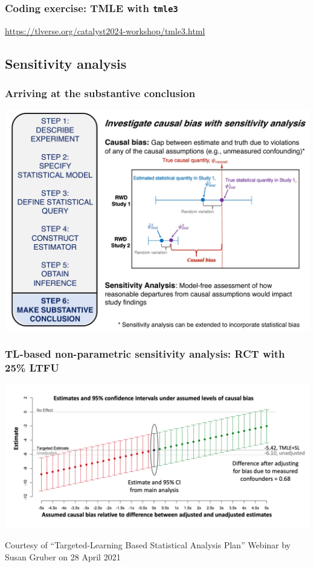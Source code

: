 \documentclass[t]{beamer}
\begin{document}
\begin{frame}
  \frametitle{Coding exercise: TMLE with \texttt{tmle3}}
  \url{https://tlverse.org/catalyst2024-workshop/tmle3.html}
\end{frame}

\subsection{Sensitivity analysis}

\begin{frame}
\frametitle{Arriving at the substantive conclusion}
\vspace{-16pt}
  \begin{center}
  \includegraphics[width = 1.02\textwidth]{figures/roadmap6.pdf}
  \end{center}
\end{frame}

\begin{frame}
\frametitle{TL-based non-parametric sensitivity analysis: RCT with 25\% LTFU}
\vspace{-10pt}
  \begin{center}
  \includegraphics[width = 1.05\textwidth]{figures/gruber_sensitivity.png}
  \end{center}
  \vspace{35pt}
\tiny{Courtesy of ``Targeted-Learning Based Statistical Analysis Plan'' Webinar by Susan Gruber on 28 April 2021}
\end{frame}
\end{document}
